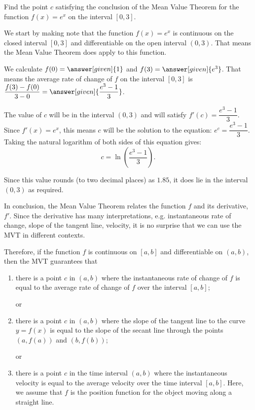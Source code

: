 \documentclass{ximera}
\begin{document}
\begin{example}
	Find the point $c$ satisfying the conclusion of the Mean Value Theorem for the function $f(x) = e^x$ on the interval $[0, 3]$.
	\begin{explanation}
		We start by making note that the function $f(x)=e^x$ is continuous on the closed interval $[0, 3]$ and differentiable on the
		open interval $(0, 3)$. That means the Mean Value Theorem does apply to this function.
		
		We calculate $f(0) = \answer[given]{1}$ and $f(3)=\answer[given]{e^3}$. That means the average rate of change of $f$
		on the interval $[0, 3]$ is $\dfrac{f(3)-f(0)}{3-0}=\answer[given]{\dfrac{e^3-1}{3}}$.

		The value of $c$ will be in the interval $(0, 3)$ and will satisfy $f'(c) = \dfrac{e^3-1}{3}$.
		Since $f'(x) = e^x$, this means $c$ will be the solution to the equation:
		$\displaystyle  e^c = \dfrac{e^3-1}{3}$. Taking the natural logarithm of both sides of this equation gives:
		\[c = \ln\left( \dfrac{e^3-1}{3} \right). \]

		Since this value rounds (to two decimal places) as $1.85$, it does lie in the interval $(0,3)$ as required.
	\end{explanation}

\end{example}


In conclusion, the Mean Value Theorem relates the function $f$ and its derivative, $f'$. Since the derivative has many interpretations,
 e.g. instantaneous rate of change, slope of the tangent line, velocity, it is no surprise that we can use the MVT in different contexts.

Therefore, if the function $f$ is continuous on $[a,b]$ and differentiable on $(a,b)$, then the MVT guarantees that
\begin{enumerate}
	\item there is a point $c$ in $(a,b)$ where the instantaneous rate of change of $f$ is equal to the average 
		rate of change of $f$ over the interval $[a,b]$;

	or

	\item there is a point $c$ in $(a,b)$ where the slope of the tangent line to the curve $y=f(x)$ is equal to the 
		slope of the secant line through the points $(a,f(a))$  and $(b,f(b))$; 

	or

	\item there is a point $c$ in the time interval $(a,b)$ where the instantaneous velocity is equal to the average 
		velocity over the time interval $[a,b]$. Here, we assume that $f$ is the position function for the object moving along a straight line.
\end{enumerate}
\end{document}
